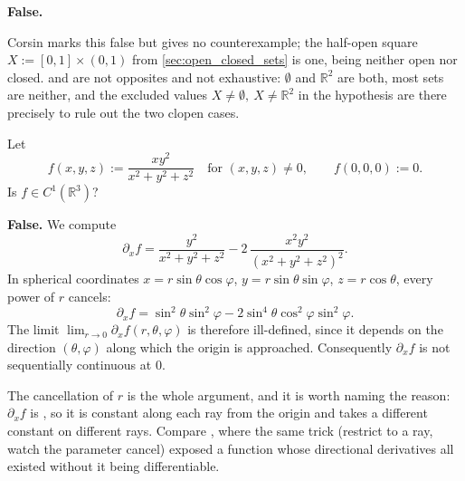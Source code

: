 \begin{answer}
\textbf{False.}
\end{answer}

\begin{ainote}
Corsin marks this false but gives no counterexample; the half-open square
$X := [0,1] \times (0,1)$ from \cref{sec:open_closed_sets} is one, being neither open
nor closed.  and  are not opposites and not exhaustive: $\emptyset$ and
$\mathbb{R}^2$ are both, most sets are neither, and the excluded values
$X \neq \emptyset,\ X \neq \mathbb{R}^2$ in the hypothesis are there precisely to rule out the
two clopen cases.
\end{ainote}

\begin{question}
\label{q:quiz_q4}
Let
\[f(x,y,z) := \frac{xy^2}{x^2+y^2+z^2} \quad \text{for } (x,y,z) \neq 0, \qquad f(0,0,0) := 0.\]
Is $f \in C^1(\mathbb{R}^3)$?
\end{question}

\begin{answer}
\textbf{False.} We compute
\[\partial_xf = \frac{y^2}{x^2+y^2+z^2} - 2\,\frac{x^2y^2}{(x^2+y^2+z^2)^2}.\]
In spherical coordinates $x = r\sin\theta\cos\varphi$, $y = r\sin\theta\sin\varphi$,
$z = r\cos\theta$, every power of $r$ cancels:
\[\partial_xf = \sin^2\theta\sin^2\varphi - 2\sin^4\theta\cos^2\varphi\sin^2\varphi.\]
The limit $\lim_{r\to0}\partial_xf(r,\theta,\varphi)$ is therefore ill-defined, since it depends
on the direction $(\theta,\varphi)$ along which the origin is approached. Consequently
$\partial_xf$ is not sequentially continuous at $0$.
\end{answer}

\begin{ainote}
The cancellation of $r$ is the whole argument, and it is worth naming the reason: $\partial_xf$
is , so it is constant along each ray from the origin and
takes a different constant on different rays. Compare
, where the same trick (restrict to a ray, watch the
parameter cancel) exposed a function whose directional derivatives all existed without it being
differentiable.
\end{ainote}


